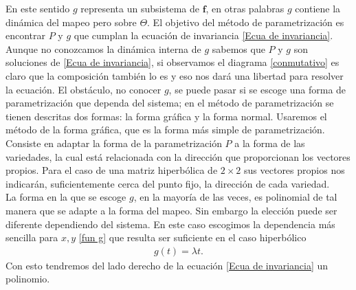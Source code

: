 En este sentido $g$ representa un subsistema de $\mathbf{f}$, en otras palabras $g$ contiene la dinámica del mapeo pero sobre $\Theta$. El objetivo del método de parametrización es encontrar $P$ y $g$ que cumplan la ecuación de invariancia \eqref{Ecua de invariancia}. Aunque no conozcamos la dinámica interna de $g$ sabemos que $P$ y $g$ son soluciones de \eqref{Ecua de invariancia}, si observamos el diagrama \eqref{conmutativo} es claro que la composición también lo es y eso nos dará una libertad para resolver la ecuación. El obstáculo, no conocer $g$, se puede pasar si se escoge una forma de parametrización que dependa del sistema; en el método de parametrización se tienen descritas dos formas: la forma gráfica y la forma normal. Usaremos el método de la forma gráfica, que es la forma más simple de parametrización. Consiste en adaptar la forma de la parametrización $P$ a la forma de las variedades, la cual está relacionada con la dirección que proporcionan los vectores propios. Para el caso de una matriz hiperbólica de $2\times 2$ sus vectores propios nos indicarán, suficientemente cerca del punto fijo, la dirección de cada variedad. \\


La forma en la que se escoge $g$, en la mayoría de las veces, es polinomial de tal manera que se adapte a la forma del mapeo. Sin embargo la elección puede ser diferente dependiendo del sistema. En este caso escogimos la dependencia más sencilla para $x,y$ \eqref{fun g} que resulta ser suficiente en el caso hiperbólico
\begin{eqnarray}
g(t) = \lambda t.
\label{fun g}
\end{eqnarray}
Con esto tendremos del lado derecho de la ecuación \eqref{Ecua de invariancia} un polinomio. \\

